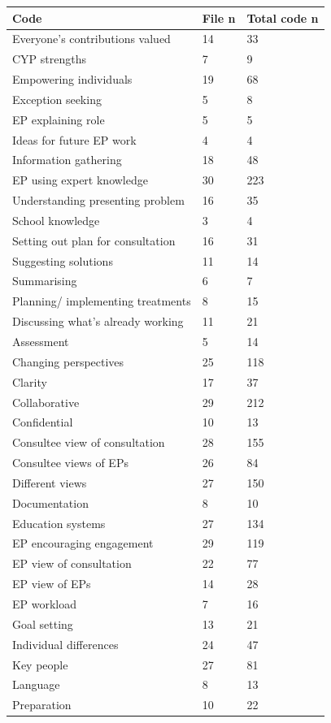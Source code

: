 \documentclass[
  english,
  man,floatsintext]{apa6}
\begin{document}
\begin{longtable}[]{@{}lll@{}}
\toprule
Code & File n & Total code n \\
\midrule
\endhead
Everyone's contributions valued & 14 & 33 \\
CYP strengths & 7 & 9 \\
Empowering individuals & 19 & 68 \\
Exception seeking & 5 & 8 \\
EP explaining role & 5 & 5 \\
Ideas for future EP work & 4 & 4 \\
Information gathering & 18 & 48 \\
EP using expert knowledge & 30 & 223 \\
Understanding presenting problem & 16 & 35 \\
School knowledge & 3 & 4 \\
Setting out plan for consultation & 16 & 31 \\
Suggesting solutions & 11 & 14 \\
Summarising & 6 & 7 \\
Planning/ implementing treatments & 8 & 15 \\
Discussing what's already working & 11 & 21 \\
Assessment & 5 & 14 \\
Changing perspectives & 25 & 118 \\
Clarity & 17 & 37 \\
Collaborative & 29 & 212 \\
Confidential & 10 & 13 \\
Consultee view of consultation & 28 & 155 \\
Consultee views of EPs & 26 & 84 \\
Different views & 27 & 150 \\
Documentation & 8 & 10 \\
Education systems & 27 & 134 \\
EP encouraging engagement & 29 & 119 \\
EP view of consultation & 22 & 77 \\
EP view of EPs & 14 & 28 \\
EP workload & 7 & 16 \\
Goal setting & 13 & 21 \\
Individual differences & 24 & 47 \\
Key people & 27 & 81 \\
Language & 8 & 13 \\
Preparation & 10 & 22 \\

\end{longtable}
\end{document}
